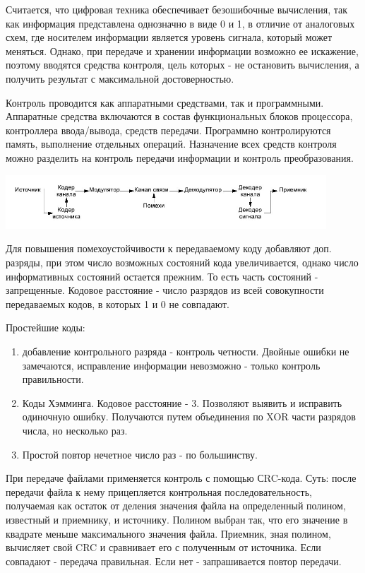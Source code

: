 \documentclass[unicode, 12pt, a4paper, oneside]{article}
\begin{document}
Считается, что цифровая техника обеспечивает безошибочные вычисления, так как информация представлена однозначно в виде 0 и 1, в отличие от аналоговых схем, где носителем информации является уровень сигнала, который может меняться. Однако, при передаче и хранении информации возможно ее искажение, поэтому вводятся средства контроля, цель которых - не остановить вычисления, а получить результат с максимальной достоверностью.

Контроль проводится как аппаратными средствами, так и программными. Аппаратные средства включаются в состав функциональных блоков процессора, контроллера ввода/вывода, средств передачи. Программно контролируются память, выполнение отдельных операций.
Назначение всех средств контроля можно разделить на контроль передачи информации и контроль преобразования.

\begin{center}
\includegraphics[width=0.9\textwidth]{116_Channel.png}\\
\end{center}
Для повышения помехоустойчивости к передаваемому коду добавляют доп. разряды, при этом число возможных состояний кода увеличивается, однако число информативных состояний остается прежним. То есть часть состояний - запрещенные. Кодовое расстояние - число разрядов из всей совокупности передаваемых кодов, в которых 1 и 0 не совпадают.

Простейшие коды:
\begin{enumerate}
\item добавление контрольного разряда - контроль четности. Двойные ошибки не замечаются, исправление информации невозможно - только контроль правильности.
\item Коды Хэмминга. Кодовое расстояние - 3. Позволяют выявить и исправить одиночную ошибку. Получаются путем объединения по XOR части разрядов числа, но несколько раз.
\item Простой повтор нечетное число раз - по большинству.
\end{enumerate}

При передаче файлами применяется контроль с помощью СRC-кода. Суть: после передачи файла к нему прицепляется контрольная последовательность, получаемая как остаток от деления значения файла на определенный полином, известный и приемнику, и источнику. Полином выбран так, что его значение в квадрате меньше максимального значения файла. Приемник, зная полином, вычисляет свой CRC и сравнивает его с полученным от источника. Если совпадают - передача правильная. Если нет - запрашивается повтор передачи.
\end{document}

